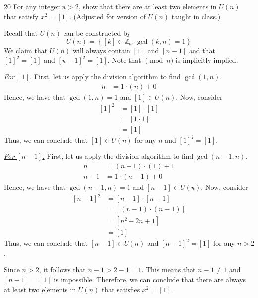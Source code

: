 \begin{hwproblem}
{20}{
    For any integer $n>2$, show that there are at least two elements in $U(n)$ that satisfy $x^2=[1]$. (Adjusted for version of \(U(n)\) taught in class.)
}

Recall that \(U(n)\) can be constructed by
\[
    U(n) = \left\{[k] \in \mathbb{Z}_n : \gcd(k, n) = 1\right\}
\]
We claim that \(U(n)\) will always contain \([1]\) and \([n-1]\) and that \([1]^2 = [1]\) and \([n-1]^2 = [1]\). Note that \(\pmod n\) is implicitly implied.

\underline{\textit{For \([1]\).}} First, let us apply the division algorithm to find \(\gcd(1, n)\).
\[
\begin{aligned}
    n &= 1 \cdot (n) + 0
\end{aligned}
\]
Hence, we have that \(\gcd(1, n) = 1\) and \([1] \in U(n)\). Now, consider
\[
\begin{aligned}
    [1]^2 &= [1] \cdot [1] \\
          &= [1 \cdot 1] \\
          &= [1]
\end{aligned}
\]
Thus, we can conclude that \([1] \in U(n)\) for any \(n\) and \([1]^2 = [1]\).

\underline{\textit{For \([n-1]\).}} First, let us apply the division algorithm to find \(\gcd(n-1, n)\).
\[
\begin{aligned}
    n &= (n-1) \cdot (1) + 1 \\
    n-1 &= 1 \cdot (n-1) + 0
\end{aligned}
\]
Hence, we have that \(\gcd(n-1, n) = 1\) and \([n-1] \in U(n)\). Now, consider
\[
\begin{aligned}
    [n-1]^2 &= [n-1] \cdot [n-1] \\
            &= [(n-1) \cdot (n-1)] \\
            &= [n^2 - 2n + 1] \\
            &= [1]
\end{aligned}
\]
Thus, we can conclude that \([n-1] \in U(n)\) and \([n-1]^2 = [1]\) for any \(n > 2\).

Since \(n > 2\), it follows that \(n-1 > 2-1 = 1\). This means that \(n-1 \neq 1\) and \([n-1] = [1]\) is impossible. Therefore, we can conclude that there are always at least two elements in \(U(n)\) that satisfies \(x^2 = [1]\).
\end{hwproblem}

